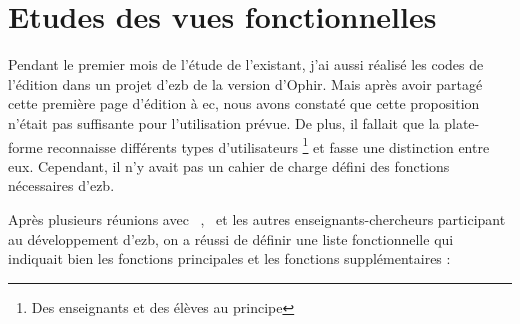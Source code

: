 \section{Etudes des vues fonctionnelles}

Pendant le premier mois de l’étude de l’existant, j’ai aussi réalisé les codes de l’édition dans un projet d’ezb de la version d’Ophir. Mais après avoir partagé cette première page d’édition à ec, nous avons constaté que cette proposition n’était pas suffisante pour l’utilisation prévue. De plus, il fallait que la plate-forme reconnaisse différents types d’utilisateurs \footnote{Des enseignants et des élèves au principe} et fasse une distinction entre eux. Cependant, il n’y avait pas un cahier de charge défini des fonctions nécessaires d’ezb. 

Après plusieurs réunions avec \ec\ , \tls\ et les autres enseignants-chercheurs participant au développement d’ezb, on a réussi de définir une liste fonctionnelle qui indiquait bien les fonctions principales et les fonctions supplémentaires :

